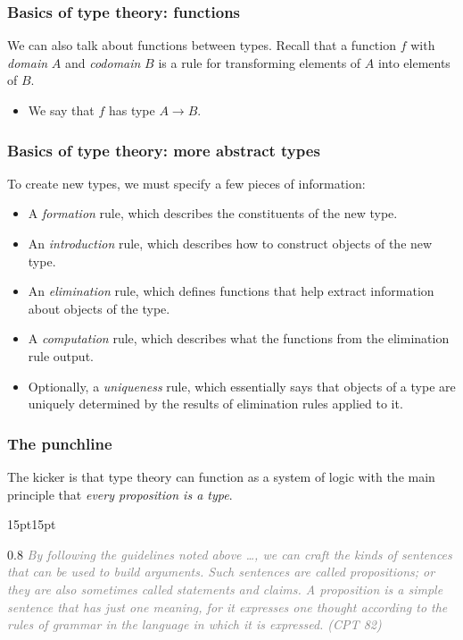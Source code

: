 \documentclass{beamer}
\providecommand{\ii}{\item}
\begin{document}
\begin{frame}\frametitle{Basics of type theory: functions}
	We can also talk about functions between types.
	Recall that a function $f$ with \emph{domain} $A$ and \emph{codomain} $B$
	is a rule for transforming elements of $A$ into elements of $B$.
	\begin{itemize}
		\ii We say that $f$ has type $A\to B$.
	\end{itemize}
\end{frame}

\begin{frame}\frametitle{Basics of type theory: more abstract types}
	To create new types, we must specify a few pieces of information:
	\begin{itemize}
		\ii A \emph{formation} rule, which describes
		the constituents of the new type.
		\ii An \emph{introduction} rule, which describes
		how to construct objects of the new type.
		\ii An \emph{elimination} rule, which defines
		functions that help extract information about objects of the type.
		\ii A \emph{computation} rule, which describes
		what the functions from the elimination rule output.
		\ii Optionally, a \emph{uniqueness} rule,
		which essentially says that objects of a type are uniquely determined by
		the results of elimination rules applied to it.
	\end{itemize}
\end{frame}

\begin{frame}\frametitle{The punchline}
	The kicker is that type theory can function as a system of logic
	with the main principle that \emph{every proposition is a type}.
	\begin{adjustwidth}{15pt}{15pt}
		\begin{spacing}{0.8}
			\textit{\textcolor{gray}{\scriptsize By following the guidelines noted above \dots, we can craft the kinds of sentences that can be used to build arguments. Such sentences are called propositions; or they are also sometimes called statements and claims. A proposition is a simple sentence that has just one meaning, for it expresses one thought according to the rules of grammar in the language in which it is expressed. (CPT 82)}}
		\end{spacing}
	\end{adjustwidth}
\end{frame}
\end{document}
